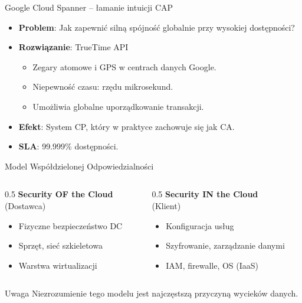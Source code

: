 \documentclass[aspectratio=169]{beamer}
\begin{document}
\begin{frame}{Google Cloud Spanner – łamanie intuicji CAP}
    \begin{itemize}
        \item \textbf{Problem}: Jak zapewnić silną spójność globalnie przy wysokiej dostępności?
        \item \textbf{Rozwiązanie}: TrueTime API
        \begin{itemize}
            \item Zegary atomowe i GPS w centrach danych Google.
            \item Niepewność czasu: rzędu mikrosekund.
            \item Umożliwia globalne uporządkowanie transakcji.
        \end{itemize}
        \item \textbf{Efekt}: System CP, który w praktyce zachowuje się jak CA.
        \item \textbf{SLA}: 99.999\% dostępności.
    \end{itemize}
\end{frame}

\begin{frame}{Model Współdzielonej Odpowiedzialności}
    \begin{columns}
        \begin{column}{0.5\textwidth}
            \textbf{Security OF the Cloud} \\
            (Dostawca)
            \begin{itemize}
                \item Fizyczne bezpieczeństwo DC
                \item Sprzęt, sieć szkieletowa
                \item Warstwa wirtualizacji
            \end{itemize}
        \end{column}
        \begin{column}{0.5\textwidth}
            \textbf{Security IN the Cloud} \\
            (Klient)
            \begin{itemize}
                \item Konfiguracja usług
                \item Szyfrowanie, zarządzanie danymi
                \item IAM, firewalle, OS (IaaS)
            \end{itemize}
        \end{column}
    \end{columns}
    \begin{alertblock}{Uwaga}
        Niezrozumienie tego modelu jest najczęstszą przyczyną wycieków danych.
    \end{alertblock}
\end{frame}
\end{document}
